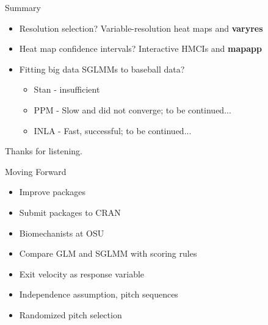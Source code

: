 \documentclass{beamer}
\begin{document}
\begin{frame}{Summary}
\begin{itemize}
\addtolength{\itemsep}{0.5\baselineskip}
\item Resolution selection? Variable-resolution heat maps and {\bf varyres}
\item Heat map confidence intervals? Interactive HMCIs and {\bf mapapp}
\item Fitting big data SGLMMs to baseball data?
  \begin{itemize}
  \addtolength{\itemsep}{0.5\baselineskip}
  \item Stan - insufficient
  \item PPM - Slow and did not converge; to be continued...
  \item INLA - Fast, successful; to be continued...
  \end{itemize}
\end{itemize}
\end{frame}

%
%
%
\begin{frame}{}
\begin{center}
\Huge{Thanks for listening.}
\end{center}
\end{frame}



\begin{frame}{Moving Forward}
\begin{itemize}
\addtolength{\itemsep}{0.5\baselineskip}
\item Improve packages
\item Submit packages to CRAN 
\item Biomechanists at OSU
\item Compare GLM and SGLMM with scoring rules
\item Exit velocity as response variable
\item Independence assumption, pitch sequences
\item Randomized pitch selection
\end{itemize}

\end{frame}
\end{document}

